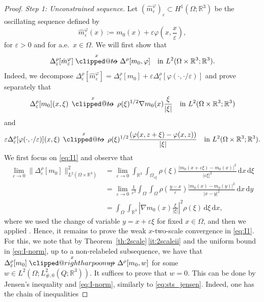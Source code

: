 \documentclass[reqno,11pt]{amsart}
\makeatletter
\numberwithin{equation}{section}
\theoremstyle{thmlemcorr}
\numberwithin{theorem}{section}
\theoremstyle{thmlemcorr*}
\theoremstyle{defi}
\theoremstyle{remexample}
\theoremstyle{ass}
\newcommand{\R}{\mathbb{R}}
\renewcommand{\epsilon}{\varepsilon}
\DeclarePairedDelimiter{\abs}{\lvert}{\rvert}
\newcommand{\1}{\mathds{1}}
\DeclareRobustCommand{\wtwoscale}{%
  \clippedrightharpoonup\mathrel{\mspace{-15mu}}\rightharpoonup
}
\newcommand{\clippedrightharpoonup}{%
  \mathrel{\mathpalette\clipped@rightharpoonup\relax}%
}
\newcommand{\clipped@rightharpoonup}[2]{%
  \sbox\z@{$\m@th#1\mspace{6mu}$}%
  \clipbox{0pt 0pt {\dimexpr\width-.5\wd\z@} 0pt}{$\m@th#1\rightharpoonup$}%
  \smash{\clipbox{{\wd\z@} 0pt 0pt {-\width}}{$\m@th#1\rightharpoonup$}}%
}
\DeclareRobustCommand{\twoscale}{%
  \clippedto\mathrel{\mspace{-15mu}}\to
}
\newcommand{\clippedto}{%
  \mathrel{\mathpalette\clipped@to\relax}%
}
\newcommand{\clipped@to}[2]{%
  \sbox\z@{$\m@th#1\mspace{6mu}$}%
  \clipbox{0pt 0pt {\dimexpr\width-.5\wd\z@} 0pt}{$\m@th#1\to$}%
  \smash{\clipbox{{\wd\z@} 0pt 0pt {-\width}}{$\m@th#1\to$}}%
}
\newcommand{\xtwoscale}{\overset{x}{\twoscale}}
\newcommand{\wxtwoscale}{\overset{x}{\wtwoscale}}
\newcommand{\Om}{\Omega}
\newcommand{\veps}{\varepsilon}
\newcommand{\dl}{\,\mathrm{d}}
\makeatother
\begin{document}
\begin{proof} \textit{Step 1: Unconstrained sequence.} 
Let $(\hat{m}^{\varphi}_\veps)_\epsilon \subset H^1(\Omega;\R^3)$ be the oscillating sequence defined by 
\begin{equation}\label{eq:hatmphi}
    \hat{m}^{\varphi}_\veps(x):= m_0(x) + \veps \varphi \left(x, \frac{x}{\veps}\right),
\end{equation}
for $\veps > 0$ and for a.e.\ $x \in \Om$. We will first show that
\[
\Delta^\rho_\epsilon[\hat{m}^{\varphi}_\veps] \xtwoscale \Delta^\rho[m_0,\varphi] \quad \text{in $L^2(\Omega\times\R^3;\R^3)$.}
\]
Indeed, we decompose  $\Delta_\epsilon^\rho[\hat{m}^{\varphi}_\veps] = \Delta_\epsilon^\rho[m_0]+ \veps \Delta_\epsilon^\rho[\varphi(\cdot,\cdot/\epsilon)]$ and prove separately that 
\begin{equation}\label{eq:I1}
    \Delta_\epsilon^\rho[m_0](x,\xi) \, \xtwoscale \, \rho(\xi)^{1/2}\nabla m_0(x) \frac{\xi}{\abs{\xi}} \quad \text{in $L^2(\Omega\times\R^3;\R^3)$}
\end{equation}
and
\begin{equation}\label{eq:I2}
    \veps \Delta_\epsilon^\rho[\varphi(\cdot,\cdot/\epsilon)](x,\xi) \, \xtwoscale \,\rho(\xi)^{1/2}\frac{(\varphi(x,z+\xi)-\varphi(x,z))}{\abs{\xi}} \quad \text{in $L^2(\Omega\times\R^3;\R^3)$}.
\end{equation}
We first focus on \eqref{eq:I1} and observe that
\begin{equation}\label{eq:I-norm}
\begin{split}
    \lim_{\veps \to 0} \|\Delta_\epsilon^\rho[m_0]\|^2_{L^2(\Om \times \R^3)} &= \lim_{\veps \to 0} \int_{\R^3} \int_{\Om_{\veps \xi}} \rho(\xi)\frac{|m_0(x+\epsilon\xi)-m_0(x)|^2}{|\veps\xi|^2}  \dl x \dl \xi \\ &= \lim_{\veps \to 0} \frac{1}{\veps^3} \int_{\Om} \int_{\Om} \rho\left(\frac{y-x}{\veps}\right)\frac{|m_0(x)-m_0(y)|^2}{|x - y|^2} \dl x \dl y \\ & = \int_{\Om} \int_{\R^3} \left| \nabla m_0(x)  \frac{\xi}{|\xi|}\right|^2 \rho(\xi) \dl \xi\dl x,
\end{split}
\end{equation}
where we used the change of variable $y = x + \veps \xi$ for fixed $x \in \Om$, and then we applied \cite[Corollary 1.4]{Pon04b}. Hence, it remains to prove the weak $x$-two-scale convergence in \eqref{eq:I1}. For this, we note that by Theorem~\ref{th:2scale}\,\ref{it:2scaleii} and the uniform bound in \eqref{eq:I-norm}, up to a non-relabeled subsequence, we have that $\Delta^\rho_\epsilon[m_0] \wxtwoscale \Delta^\rho[m_0,w]$ for some $w \in L^2(\Omega;L^2_{\#,0}(Q;\R^3))$. It suffices to prove that $w=0$. This can be done by Jensen's inequality and \eqref{eq:I-norm}, similarly to \eqref{eq:sts_jensen}. Indeed, one has the chain of inequalities

\end{proof}
\end{document}
